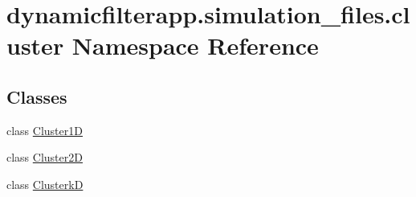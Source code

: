 \hypertarget{namespacedynamicfilterapp_1_1simulation__files_1_1cluster}{}\section{dynamicfilterapp.\+simulation\+\_\+files.\+cluster Namespace Reference}
\label{namespacedynamicfilterapp_1_1simulation__files_1_1cluster}
\subsection*{Classes}
\begin{DoxyCompactItemize}
\item 
class \mbox{\hyperlink{classdynamicfilterapp_1_1simulation__files_1_1cluster_1_1_cluster1_d}{Cluster1D}}
\item 
class \mbox{\hyperlink{classdynamicfilterapp_1_1simulation__files_1_1cluster_1_1_cluster2_d}{Cluster2D}}
\item 
class \mbox{\hyperlink{classdynamicfilterapp_1_1simulation__files_1_1cluster_1_1_clusterk_d}{ClusterkD}}
\end{DoxyCompactItemize}
